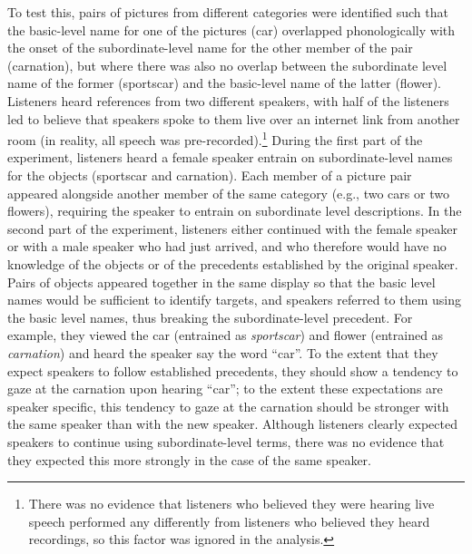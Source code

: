 \documentclass[doc,fignum,apacite,floatsintext]{apa6}
\begin{document}
To test this, pairs of pictures from different categories were identified such that the basic-level name for one of the pictures (car) overlapped phonologically with the onset of the subordinate-level name for the other member of the pair (carnation), but where there was also no overlap between the subordinate level name of the former (sportscar) and the basic-level name of the latter (flower).  Listeners heard references from two different speakers, with half of the listeners led to believe that speakers spoke to them live over an internet link from another room (in reality, all speech was pre-recorded).\footnote{There was no evidence that listeners who believed they were hearing live speech performed any differently from listeners who believed they heard recordings, so this factor was ignored in the analysis.}  During the first part of the experiment, listeners heard a female speaker entrain on subordinate-level names for the objects (sportscar and carnation).  Each member of a picture pair appeared alongside another member of the same category (e.g., two cars or two flowers), requiring the speaker to entrain on subordinate level descriptions.  In the second part of the experiment, listeners either continued with the female speaker or with a male speaker who had just arrived, and who therefore would have no knowledge of the objects or of the precedents established by the original speaker.  Pairs of objects appeared together in the same display so that the basic level names would be sufficient to identify targets, and speakers referred to them using the basic level names, thus breaking the subordinate-level precedent.  For example, they viewed the car (entrained as \textit{sportscar}) and flower (entrained as \textit{carnation}) and heard the speaker say the word ``car''.  To the extent that they expect speakers to follow established precedents, they should show a tendency to gaze at the carnation upon hearing ``car''; to the extent these expectations are speaker specific, this tendency to gaze at the carnation should be stronger with the same speaker than with the new speaker.  Although listeners clearly expected speakers to continue using subordinate-level terms, there was no evidence that they expected this more strongly in the case of the same speaker.  
\end{document}
